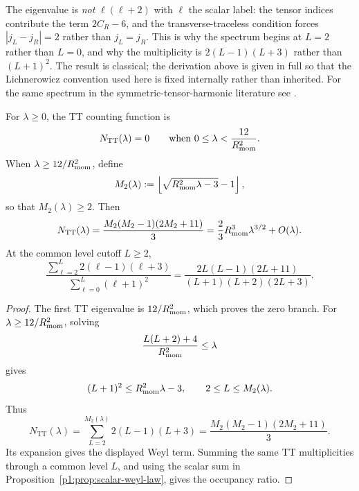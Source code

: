 \documentclass[11pt]{article}
\begin{document}
\begin{remark}
The eigenvalue is \emph{not} \(\ell(\ell+2)\) with \(\ell\) the scalar label: the
tensor indices contribute the term \(2C_R-6\), and the transverse-traceless
condition forces \(|j_L-j_R|=2\) rather than \(j_L=j_R\).  This is why the
spectrum begins at \(L=2\) rather than \(L=0\), and why the multiplicity is
\(2(L-1)(L+3)\) rather than \((L+1)^2\).  The result is classical; the
derivation above is given in full so that the Lichnerowicz convention used here
is fixed internally rather than inherited.  For the same spectrum in the
symmetric-tensor-harmonic literature see
\cite{Higuchi1987,Higuchi2002Erratum}.
\end{remark}

\begin{corollary}
\label{p1:cor:tt-counting}
For \(\lambda\ge0\), the TT counting function is
\[
  N_{\mathrm{TT}}(\lambda)=0
  \qquad\text{when }0\le\lambda<\frac{12}{R_{\mathrm{mom}}^2}.
\]
When \(\lambda\ge12/R_{\mathrm{mom}}^2\), define
\[
  M_2(\lambda):=\left\lfloor\sqrt{R_{\mathrm{mom}}^2\lambda-3}-1\right\rfloor,
\]
so that \(M_2(\lambda)\ge2\).  Then
\[
  N_{\mathrm{TT}}(\lambda)
  =\frac{M_2(M_2-1)(2M_2+11)}3
  =\frac23R_{\mathrm{mom}}^3\lambda^{3/2}+O(\lambda).
\]
At the common level cutoff \(L\ge2\),
\[
  \frac{\sum_{\ell=2}^{L}2(\ell-1)(\ell+3)}
       {\sum_{\ell=0}^{L}(\ell+1)^2}
  =\frac{2L(L-1)(2L+11)}{(L+1)(L+2)(2L+3)}.
\]
\end{corollary}

\begin{proof}
The first TT eigenvalue is \(12/R_{\mathrm{mom}}^2\), which proves the zero branch.
For \(\lambda\ge12/R_{\mathrm{mom}}^2\), solving
\[
  \frac{L(L+2)+4}{R_{\mathrm{mom}}^2}\le\lambda
\]
gives
\[
  (L+1)^2\le R_{\mathrm{mom}}^2\lambda-3,
  \qquad
  2\le L\le M_2(\lambda).
\]
Thus
\[
  N_{\mathrm{TT}}(\lambda)
  =\sum_{L=2}^{M_2(\lambda)}2(L-1)(L+3)
  =\frac{M_2(M_2-1)(2M_2+11)}3.
\]
Its expansion gives the displayed Weyl term.  Summing the same TT
multiplicities through a common level \(L\), and using the scalar sum in
Proposition~\ref{p1:prop:scalar-weyl-law}, gives the occupancy ratio.
\end{proof}
\end{document}
